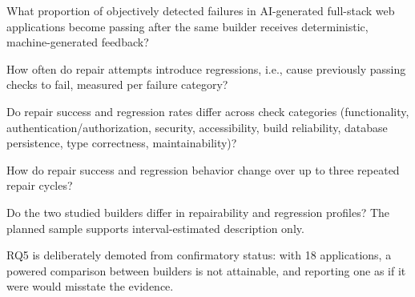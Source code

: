 \begin{description}[leftmargin=1.6em]
\item[RQ1.] What proportion of objectively detected failures in AI-generated
full-stack web applications become passing after the same builder receives
deterministic, machine-generated feedback?
\item[RQ2.] How often do repair attempts introduce regressions, i.e., cause
previously passing checks to fail, measured per failure category?
\item[RQ3.] Do repair success and regression rates differ across check categories
(functionality, authentication/authorization, security, accessibility, build
reliability, database persistence, type correctness, maintainability)?
\item[RQ4.] How do repair success and regression behavior change over up to three
repeated repair cycles?
\item[RQ5 (exploratory).] Do the two studied builders differ in repairability and
regression profiles? The planned sample supports interval-estimated description
only.
\end{description}

RQ5 is deliberately demoted from confirmatory status: with 18 applications, a
powered comparison between builders is not attainable, and reporting one as if it
were would misstate the evidence.

